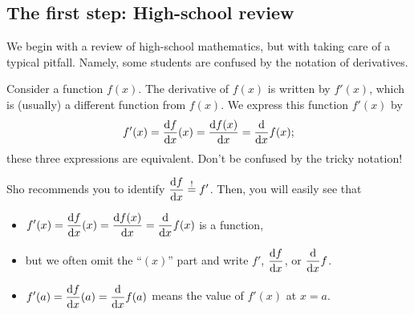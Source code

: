\documentclass[11pt,pdfa,lastpage]{MishoNote}
\begin{document}
\begin{maketitle}
\makeatletter
{}
\makeatother

\end{maketitle}
\newpage
\subsection{The first step: High-school review}
We begin with a review of high-school mathematics, but with taking care of a typical pitfall.
Namely, some students are confused by the notation of derivatives.

Consider a function $f(x)$. The derivative of $f(x)$ is written by $f'(x)$, which is (usually) a different function from $f(x)$.
We express this function $f'(x)$ by
\[ f'(x) = \diff{f}{x}(x) = \diff{f(x)}{x} = \diff{}{x}f(x); \]
these three expressions are equivalent.
Don't be confused by the tricky notation!

Sho recommends you to identify $\displaystyle \diff{f}{x} \stackrel!= f'$. Then, you will easily see that
\begin{itemize}
  \item $\displaystyle f'(x)=\diff{f}{x}(x)=\diff{f(x)}{x}=\diff{}{x}f(x)$ is a function,
  \item but we often omit the ``$(x)$'' part and write $\displaystyle f'$, $\displaystyle\diff fx$, or $\displaystyle\diff{}xf$.
  \item $\displaystyle f'(a)=\diff{f}{x}(a)=\diff{}xf(a)$ means the value of $f'(x)$ at $x=a$.
\end{itemize}
\end{document}
